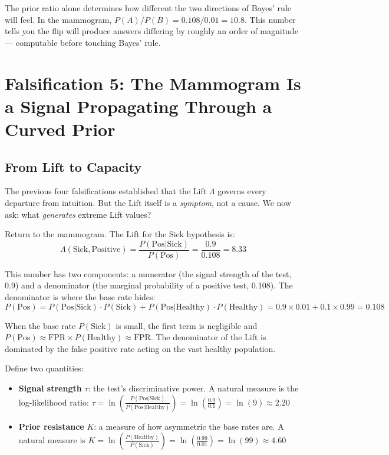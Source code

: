 \documentclass[12pt]{article}
\begin{document}
The prior ratio alone determines how different the two directions of Bayes' rule will feel. In the mammogram, $P(A)/P(B) = 0.108/0.01 = 10.8$. This number tells you the flip will produce answers differing by roughly an order of magnitude --- computable before touching Bayes' rule.

\section{Falsification 5: The Mammogram Is a Signal Propagating Through a Curved Prior}

\subsection{From Lift to Capacity}

The previous four falsifications established that the Lift $\Lambda$ governs every departure from intuition. But the Lift itself is a \textit{symptom}, not a cause. We now ask: what \textit{generates} extreme Lift values?

Return to the mammogram. The Lift for the Sick hypothesis is:
\begin{equation}
\Lambda(\text{Sick}, \text{Positive}) = \frac{P(\text{Pos}|\text{Sick})}{P(\text{Pos})} = \frac{0.9}{0.108} = 8.33
\end{equation}

This number has two components: a numerator (the signal strength of the test, 0.9) and a denominator (the marginal probability of a positive test, 0.108). The denominator is where the base rate hides:
\begin{equation}
P(\text{Pos}) = P(\text{Pos}|\text{Sick}) \cdot P(\text{Sick}) + P(\text{Pos}|\text{Healthy}) \cdot P(\text{Healthy}) = 0.9 \times 0.01 + 0.1 \times 0.99 = 0.108
\end{equation}

When the base rate $P(\text{Sick})$ is small, the first term is negligible and $P(\text{Pos}) \approx \text{FPR} \times P(\text{Healthy}) \approx \text{FPR}$. The denominator of the Lift is dominated by the false positive rate acting on the vast healthy population.

Define two quantities:
\begin{itemize}[nosep]
\item \textbf{Signal strength} $\tau$: the test's discriminative power. A natural measure is the log-likelihood ratio: $\tau = \ln\left(\frac{P(\text{Pos}|\text{Sick})}{P(\text{Pos}|\text{Healthy})}\right) = \ln\left(\frac{0.9}{0.1}\right) = \ln(9) \approx 2.20$
\item \textbf{Prior resistance} $K$: a measure of how asymmetric the base rates are. A natural measure is $K = \ln\left(\frac{P(\text{Healthy})}{P(\text{Sick})}\right) = \ln\left(\frac{0.99}{0.01}\right) = \ln(99) \approx 4.60$
\end{itemize}
\end{document}
